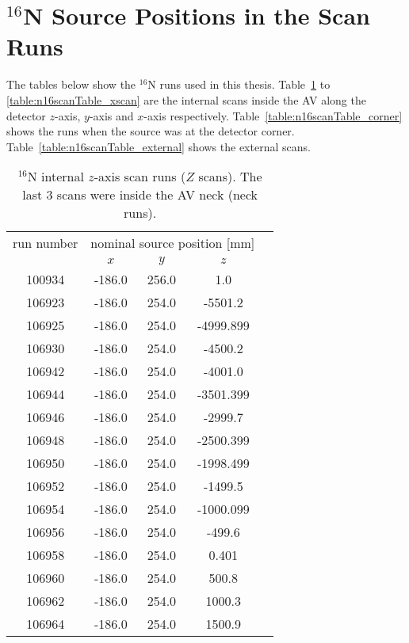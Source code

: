 \section{$^{16}$N Source Positions in the Scan Runs}\label{appendix:calibration}
The tables below show the $^{16}$N runs used in this thesis. Table~\ref{table:n16scanTable_zscan} to \ref{table:n16scanTable_xscan} are the internal scans inside the AV along the detector $z$-axis, $y$-axis and $x$-axis respectively. Table~\ref{table:n16scanTable_corner} shows the runs when the source was at the detector corner. Table~\ref{table:n16scanTable_external} shows the external scans.
\begin{table}[ht]
		\caption[$^{16}$N internal $z$-axis scan runs.]{$^{16}$N internal $z$-axis scan runs ($Z$ scans). The last 3 scans were inside the AV neck (neck runs).\label{table:n16scanTable_zscan}}
				\vspace{2mm}
			\centering
	\begin{tabular*}{90mm}{c@{\extracolsep{\fill}}*4c}
		\toprule 
		run number  & \multicolumn{3}{c}{nominal source position [mm]}  \\
                                \cline{2-4}
			& $x$ & $y$ & $z$\\
		\midrule
		100934 & -186.0 & 256.0 & 1.0\\
        106923 & -186.0 & 254.0 & -5501.2\\
        106925 & -186.0 & 254.0 & -4999.899\\
        106930 & -186.0 & 254.0 & -4500.2\\
        106942 & -186.0 & 254.0 & -4001.0\\
        106944 & -186.0 & 254.0 & -3501.399\\
        106946 & -186.0 & 254.0 & -2999.7\\
        106948 & -186.0 & 254.0 & -2500.399\\
        106950 & -186.0 & 254.0 & -1998.499\\
        106952 & -186.0 & 254.0 & -1499.5\\
        106954 & -186.0 & 254.0 & -1000.099\\
        106956 & -186.0 & 254.0 & -499.6\\
        106958 & -186.0 & 254.0 & 0.401 \\
        106960 & -186.0 & 254.0 & 500.8\\
        106962 & -186.0 & 254.0 & 1000.3\\
        106964 & -186.0 & 254.0 & 1500.9\\

\end{tabular*}
\end{table}
